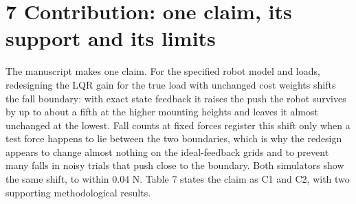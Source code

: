 \documentclass[11pt,a4paper]{article}
\begin{document}
\section*{7 Contribution: one claim, its support and its limits}
The manuscript makes one claim. For the specified robot model and loads, redesigning the LQR gain for the true load with unchanged cost weights shifts the fall boundary: with exact state feedback it raises the push the robot survives by up to about a fifth at the higher mounting heights and leaves it almost unchanged at the lowest. Fall counts at fixed forces register this shift only when a test force happens to lie between the two boundaries, which is why the redesign appears to change almost nothing on the ideal-feedback grids and to prevent many falls in noisy trials that push close to the boundary. Both simulators show the same shift, to within 0.04 N. Table 7 states the claim as C1 and C2, with two supporting methodological results.
\end{document}
